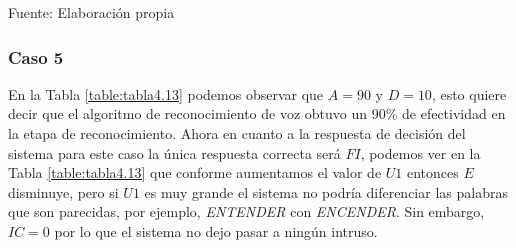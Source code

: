 \begin{center}
\begin{table}[H]
\centering
\caption{\small{Resultados para obtener U1 en el caso 4.}}
\label{table:tabla4.12}
\vskip 0.2cm
\begin{center}
\vskip 0.2cm
{\small{Fuente: Elaboración propia}}
\end{center}
\end{table}
\end{center}

\subsubsection{Caso 5}
En la Tabla \ref{table:tabla4.13} podemos observar que $A = 90$ y $D = 10$, esto quiere decir que el algoritmo de reconocimiento de voz obtuvo un 90\% de efectividad en la etapa de reconocimiento.
\vskip 0.5cm
Ahora en cuanto a la respuesta de decisión del sistema para este caso la única respuesta correcta será $FI$, podemos ver en la Tabla \ref{table:tabla4.13} que conforme aumentamos el valor de $U1$ entonces $E$ disminuye, pero si $U1$ es muy grande el sistema no podría diferenciar las palabras que son parecidas, por ejemplo, \textit{ENTENDER} con \textit{ENCENDER}. Sin embargo, $IC = 0$ por lo que el sistema no dejo pasar a ningún intruso.

